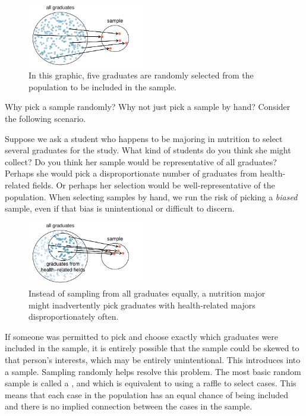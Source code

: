 \begin{figure}[ht]
\centering
\includegraphics[width=0.47\textwidth]{ch_intro_to_data/figures/popToSample/popToSampleGraduates}
\caption{In this graphic, five graduates are randomly selected from the population to be included in the sample.}
\label{popToSampleGraduates}
\end{figure}

Why pick a sample randomly? Why not just pick a sample by hand? Consider the following scenario.

\begin{example}{Suppose we ask a student who happens to be majoring in nutrition to select several graduates for the study. What kind of students do you think she might collect? Do you think her sample would be representative of all graduates?}
Perhaps she would pick a disproportionate number of graduates from health-related fields. Or perhaps her selection would be well-representative of the population. When selecting samples by hand, we run the risk of picking a \emph{biased} sample, even if that bias is unintentional or difficult to discern.
\end{example}

\begin{figure}
\centering
\includegraphics[width=0.47\textwidth]{ch_intro_to_data/figures/popToSample/popToSubSampleGraduates}
\caption{Instead of sampling from all graduates equally, a nutrition major might inadvertently pick graduates with health-related majors disproportionately often.}
\label{popToSubSampleGraduates}
\end{figure}

If someone was permitted to pick and choose exactly which graduates were included in the sample, it is entirely possible that the sample could be skewed to that person's interests, which may be entirely unintentional. This introduces  into a sample. Sampling randomly helps resolve this problem. The most basic random sample is called a , and which is equivalent to using a raffle to select cases. This means that each case in the population has an equal chance of being included and there is no implied connection between the cases in the sample.

